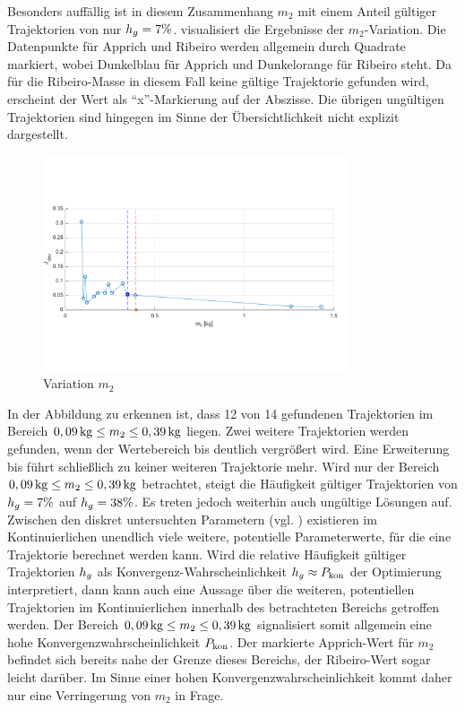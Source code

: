 Besonders auffällig ist in diesem Zusammenhang $m_2$ mit einem Anteil gültiger Trajektorien von nur $h_g=7\%$.  visualisiert die Ergebnisse der $m_2$-Variation. Die Datenpunkte für Apprich und Ribeiro werden allgemein durch Quadrate markiert, wobei Dunkelblau für Apprich und Dunkelorange für Ribeiro steht. Da für die Ribeiro-Masse in diesem Fall keine gültige Trajektorie gefunden wird, erscheint der Wert als "`x"'-Markierung auf der Abszisse. Die übrigen ungültigen Trajektorien sind hingegen im Sinne der Übersichtlichkeit nicht explizit dargestellt.

\begin{figure}
	\centering
		\includegraphics[width=0.8\textwidth]{Bilder/Trajektorien/m2.pdf}
	\caption{Variation $m_2$}
	\label{fig:trjvarm2}
\end{figure}

In der Abbildung zu erkennen ist, dass 12 von 14 gefundenen Trajektorien im Bereich $0,09\,\mathrm{kg}\leq m_2 \leq0,39\,\mathrm{kg}$ liegen. Zwei weitere Trajektorien werden gefunden, wenn der Wertebereich bis  deutlich vergrößert wird. Eine Erweiterung bis  führt schließlich zu keiner weiteren Trajektorie mehr. Wird nur der Bereich $0,09\,\mathrm{kg}\leq m_2 \leq0,39\,\mathrm{kg}$ betrachtet, steigt die Häufigkeit gültiger Trajektorien von $h_g=7\%$ auf $h_g=38\%$. Es treten jedoch weiterhin auch ungültige Lösungen auf. Zwischen den diskret untersuchten Parametern (vgl. ) existieren im Kontinuierlichen unendlich viele weitere, potentielle Parameterwerte, für die eine Trajektorie berechnet werden kann. Wird die relative Häufigkeit gültiger Trajektorien $h_g$ als Konvergenz-Wahrscheinlichkeit  $h_g\approx P_{\mathrm{kon}}$ der Optimierung interpretiert, dann kann auch eine Aussage über die weiteren, potentiellen Trajektorien im Kontinuierlichen innerhalb des betrachteten Bereichs getroffen werden. Der Bereich $0,09\,\mathrm{kg}\leq m_2 \leq0,39\,\mathrm{kg}$ signalisiert somit allgemein eine hohe Konvergenzwahrscheinlichkeit $P_{\mathrm{kon}}$. Der markierte Apprich-Wert für $m_2$ befindet sich bereits nahe der Grenze dieses Bereichs, der Ribeiro-Wert sogar leicht darüber. Im Sinne einer hohen Konvergenzwahrscheinlichkeit kommt daher nur eine Verringerung von $m_2$ in Frage. 

